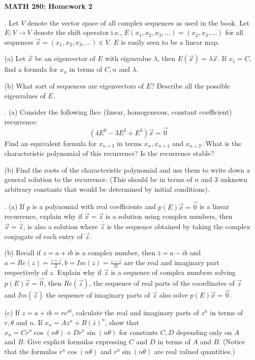 \documentclass[12 pt]{article}
\begin{document}
\centerline{\bf MATH 280: Homework 2 }

\bigskip

. Let $V$ denote the vector space of all complex sequences as used in the book. Let $E: V \to V$ denote 
the shift operator i.e., $E(x_1,x_2, x_3, \dots) = (x_2, x_3, \dots)$ for all sequences $\vec{x} = (x_1,x_2,x_3,\dots) \in V$.
$E$ is easily seen to be a linear map.

\noindent
(a) Let $\vec{x}$ be an eigenvector of $E$ with eigenvalue $\lambda$, then $E(\vec{x}) = \lambda \vec{x}$. 
If $x_1=C$, find a formula for $x_n$ in terms of $C, n$ and $\lambda$.

\noindent
(b) What sort of sequences are eigenvectors of $E$? Describe all the possible eigenvalues of $E$.

\medskip

. 
(a) Consider the following lhcc (linear, homogeneous, constant coefficient) recurrence:
$$
(4E^0 - 3E^2 + E^3)\vec{x} = \vec{0}
$$
Find an equivalent formula for $x_{n+3}$ in terms $x_n, x_{n+1}$ and $x_{n+2}$. 
What is the characteristic polynomial of this recurrence? Is the recurrence stable?

\noindent
(b) Find the roots of the characteristic polynomial and use them to write down a general 
solution to the recurrence. (This should be in terms of $n$ and $3$ unknown arbitrary constants that would be determined by initial conditions).

\medskip

. (a) If $p$ is a polynomial with real coefficients and $p(E) \vec{x} = \vec{0}$ is a linear recurrence, explain why if $\vec{x} = \vec{z}$ 
is a solution using complex numbers, then $\vec{x} = \bar{\vec{z}}$, is also a solution where $\bar{\vec{z}}$ is the sequence obtained 
by taking the complex conjugate of each entry of $\vec{z}$. 

\medskip

\noindent
(b) Recall if $z=a+ib$ is a complex number, then $\bar{z}=a-ib$ and $a=Re(z) = \frac{z+\bar{z}}{2}, b=Im(z)=\frac{z-\bar{z}}{2i}$ are the real 
and imaginary part respectively of $z$. Explain why if $\vec{z}$ is a sequence of complex numbers solving $p(E) \vec{x}=\vec{0}$, 
then $Re(\vec{z})$, the sequence of real parts of the coordinates of $\vec{z}$ and $Im(\vec{z})$ the sequence of imaginary parts of 
$\vec{z}$ also solve $p(E)\vec{x}=\vec{0}$.

\medskip

\noindent
(c) If $z=a+ib=re^{i \theta}$, calculate the real and imaginary parts of $z^n$ in terms of $r, \theta$ and $n$. 
If $x_n = Az^n + B(\bar{z})^n$, show that $x_n = Cr^n\cos(n \theta) + Dr ^n\sin(n \theta)$ for constants $C, D$ depending only 
on $A$ and $B$. Give explicit formulas expressing $C$ and $D$ in terms of $A$ and $B$. (Notice that the formulas $r^n \cos(n \theta)$ 
and $r^n \sin(n \theta)$ are real valued quantities.)
\end{document}
